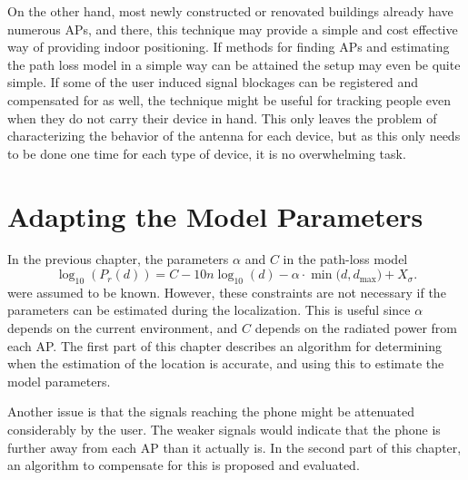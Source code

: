 \documentclass{LTHthesis}
\begin{document}
On the other hand, most newly constructed or renovated buildings already have numerous APs, and there, this technique may provide a simple and cost effective way of providing indoor positioning. If methods for finding APs and estimating the path loss model in a simple way can be attained the setup may even be quite simple. If some of the user induced signal blockages can be registered and compensated for as well, the technique might be useful for tracking people even when they do not carry their device in hand. This only leaves the problem of characterizing the behavior of the antenna for each device, but as this only needs to be done one time for each type of device, it is no overwhelming task.        
%
\chapter{Adapting the Model Parameters} %
\label{chap:adapt}
%

In the previous chapter, the parameters $\alpha$ and $C$ in the path-loss model 
%
\begin{equation}
\log_{10}({P_r(d)})=C-10n\log_{10}(d) - \alpha\cdot\min({d, d_{\text{max}})}+ X_\sigma.
\label{equation:model_to_adapt}
\end{equation}
%
were assumed to be known. However, these constraints are not necessary if the parameters can be estimated during the localization. This is useful since $\alpha$ depends on the current environment, and $C$ depends on the radiated power from each AP. The first part of this chapter describes an algorithm for determining when the estimation of the location is accurate, and using this to estimate the model parameters. 

Another issue is that the signals reaching the phone might be attenuated considerably by the user. The weaker signals would indicate that the phone is further away from each AP than it actually is. In the second part of this chapter, an algorithm to compensate for this is proposed and evaluated.

%
\end{document}
